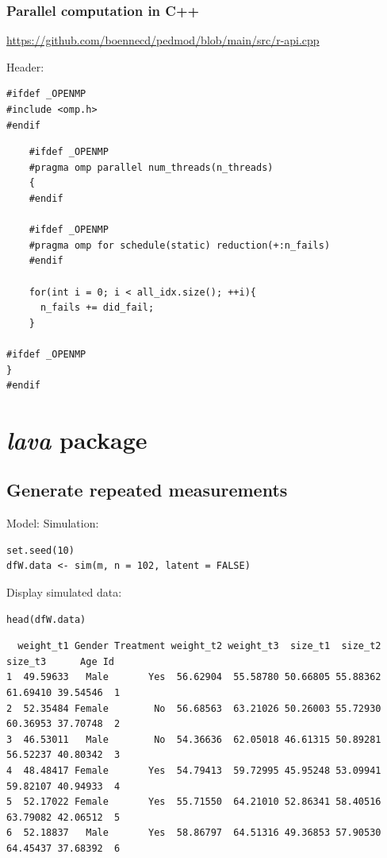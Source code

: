 \documentclass{article}
\begin{document}
\subsubsection{Parallel computation in C++}
\label{sec:orgaec390c}
\url{https://github.com/boennecd/pedmod/blob/main/src/r-api.cpp}

Header:
\lstset{language=C++,label= ,caption= ,captionpos=b,numbers=none}
\begin{lstlisting}
#ifdef _OPENMP
#include <omp.h>
#endif
\end{lstlisting}


\lstset{language=C++,label= ,caption= ,captionpos=b,numbers=none}
\begin{lstlisting}
    #ifdef _OPENMP
    #pragma omp parallel num_threads(n_threads)
    {
    #endif

    #ifdef _OPENMP
    #pragma omp for schedule(static) reduction(+:n_fails)
    #endif

    for(int i = 0; i < all_idx.size(); ++i){
      n_fails += did_fail;
    }

#ifdef _OPENMP
}
#endif
\end{lstlisting}

\section{\emph{lava} package}
\label{sec:org84ffe57}
\subsection{Generate repeated measurements}
\label{sec:org94967d6}
Model:
Simulation:
\lstset{language=r,label= ,caption= ,captionpos=b,numbers=none}
\begin{lstlisting}
set.seed(10)
dfW.data <- sim(m, n = 102, latent = FALSE)
\end{lstlisting}

Display simulated data:
\lstset{language=r,label= ,caption= ,captionpos=b,numbers=none}
\begin{lstlisting}
head(dfW.data)
\end{lstlisting}

\begin{verbatim}
  weight_t1 Gender Treatment weight_t2 weight_t3  size_t1  size_t2  size_t3      Age Id
1  49.59633   Male       Yes  56.62904  55.58780 50.66805 55.88362 61.69410 39.54546  1
2  52.35484 Female        No  56.68563  63.21026 50.26003 55.72930 60.36953 37.70748  2
3  46.53011   Male        No  54.36636  62.05018 46.61315 50.89281 56.52237 40.80342  3
4  48.48417 Female       Yes  54.79413  59.72995 45.95248 53.09941 59.82107 40.94933  4
5  52.17022 Female       Yes  55.71550  64.21010 52.86341 58.40516 63.79082 42.06512  5
6  52.18837   Male       Yes  58.86797  64.51316 49.36853 57.90530 64.45437 37.68392  6
\end{verbatim}
\end{document}
